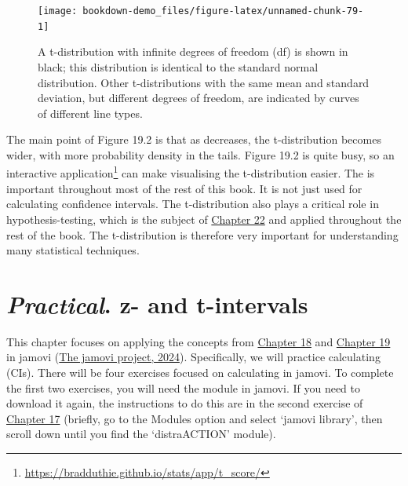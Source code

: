 \documentclass[
  openany]{krantz}
\begin{document}
\begin{figure}
\texttt{[image: bookdown-demo\_files/figure-latex/unnamed-chunk-79-1]} \caption{A t-distribution with infinite degrees of freedom (df) is shown in black; this distribution is identical to the standard normal distribution. Other t-distributions with the same mean and standard deviation, but different degrees of freedom, are indicated by curves of different line types.}\label{fig:unnamed-chunk-79}
\end{figure}

\newpage

The main point of Figure 19.2 is that as  decreases, the t-distribution becomes wider, with more probability density in the tails.
Figure 19.2 is quite busy, so an interactive application\footnote{\url{https://bradduthie.github.io/stats/app/t_score/}} can make visualising the t-distribution easier.
The  is important throughout most of the rest of this book.
It is not just used for calculating confidence intervals.
The t-distribution also plays a critical role in hypothesis-testing, which is the subject of \protect\hyperlink{Chapter_22}{Chapter 22} and applied throughout the rest of the book.
The t-distribution is therefore very important for understanding many statistical techniques.

\hypertarget{Chapter_20}{%
\chapter{\texorpdfstring{\emph{Practical}. z- and t-intervals}{Practical. z- and t-intervals}}\label{Chapter_20}}

This chapter focuses on applying the concepts from \protect\hyperlink{Chapter_18}{Chapter 18} and \protect\hyperlink{Chapter_19}{Chapter 19} in jamovi (\protect\hyperlink{ref-Jamovi2022}{The jamovi project, 2024}).
Specifically, we will practice calculating  (CIs).
There will be four exercises focused on calculating  in jamovi.
To complete the first two exercises, you will need the  module in jamovi.
If you need to download it again, the instructions to do this are in the second exercise of \protect\hyperlink{Chapter_17}{Chapter 17} (briefly, go to the Modules option and select `jamovi library', then scroll down until you find the `distraACTION' module).
\end{document}
